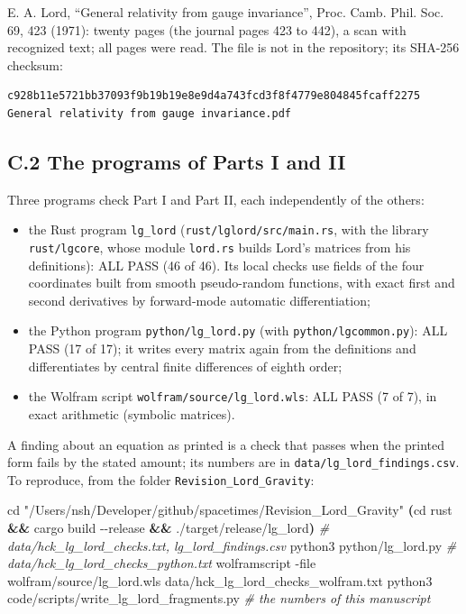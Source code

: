 \documentclass[
  10pt,
]{article}
\newenvironment{Shaded}{}{}
\newcommand{\AttributeTok}[1]{\textcolor[rgb]{0.49,0.56,0.16}{#1}}
\newcommand{\BuiltInTok}[1]{\textcolor[rgb]{0.00,0.50,0.00}{#1}}
\newcommand{\CommentTok}[1]{\textcolor[rgb]{0.38,0.63,0.69}{\textit{#1}}}
\newcommand{\ExtensionTok}[1]{#1}
\newcommand{\KeywordTok}[1]{\textcolor[rgb]{0.00,0.44,0.13}{\textbf{#1}}}
\newcommand{\NormalTok}[1]{#1}
\newcommand{\StringTok}[1]{\textcolor[rgb]{0.25,0.44,0.63}{#1}}
\providecommand{\tightlist}{%
  \setlength{\itemsep}{0pt}\setlength{\parskip}{0pt}}
\begin{document}
E. A. Lord, ``General relativity from gauge invariance'', Proc. Camb.
Phil. Soc. 69, 423 (1971): twenty pages (the journal pages 423 to 442),
a scan with recognized text; all pages were read. The file is not in the
repository; its SHA-256 checksum:

\begin{verbatim}
c928b11e5721bb37093f9b19b19e8e9d4a743fcd3f8f4779e804845fcaff2275  General relativity from gauge invariance.pdf
\end{verbatim}

\hypertarget{c.2-the-programs-of-parts-i-and-ii}{%
\subsection{C.2 The programs of Parts I and
II}\label{c.2-the-programs-of-parts-i-and-ii}}

Three programs check Part I and Part II, each independently of the
others:

\begin{itemize}
\tightlist
\item
  the Rust program \texttt{lg\_lord} (\texttt{rust/lglord/src/main.rs},
  with the library \texttt{rust/lgcore}, whose module \texttt{lord.rs}
  builds Lord's matrices from his definitions): ALL PASS (46 of 46). Its
  local checks use fields of the four coordinates built from smooth
  pseudo-random functions, with exact first and second derivatives by
  forward-mode automatic differentiation;
\item
  the Python program \texttt{python/lg\_lord.py} (with
  \texttt{python/lgcommon.py}): ALL PASS (17 of 17); it writes every
  matrix again from the definitions and differentiates by central finite
  differences of eighth order;
\item
  the Wolfram script \texttt{wolfram/source/lg\_lord.wls}: ALL PASS (7
  of 7), in exact arithmetic (symbolic matrices).
\end{itemize}

A finding about an equation as printed is a check that passes when the
printed form fails by the stated amount; its numbers are in
\texttt{data/lg\_lord\_findings.csv}. To reproduce, from the folder
\texttt{Revision\_Lord\_Gravity}:

\begin{Shaded}
\begin{Highlighting}[]
\BuiltInTok{cd} \StringTok{"/Users/nsh/Developer/github/spacetimes/Revision\_Lord\_Gravity"}
\KeywordTok{(}\BuiltInTok{cd}\NormalTok{ rust }\KeywordTok{\&\&} \ExtensionTok{cargo}\NormalTok{ build }\AttributeTok{{-}{-}release} \KeywordTok{\&\&} \ExtensionTok{./target/release/lg\_lord}\KeywordTok{)}   \CommentTok{\# data/hck\_lg\_lord\_checks.txt, lg\_lord\_findings.csv}
\ExtensionTok{python3}\NormalTok{ python/lg\_lord.py                                         }\CommentTok{\# data/hck\_lg\_lord\_checks\_python.txt}
\ExtensionTok{wolframscript} \AttributeTok{{-}file}\NormalTok{ wolfram/source/lg\_lord.wls data/hck\_lg\_lord\_checks\_wolfram.txt}
\ExtensionTok{python3}\NormalTok{ code/scripts/write\_lg\_lord\_fragments.py                  }\CommentTok{\# the numbers of this manuscript}
\end{Highlighting}
\end{Shaded}
\end{document}
